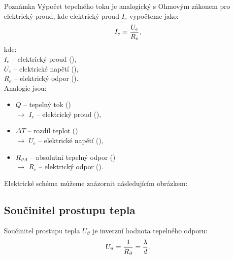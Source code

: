 \documentclass{article}
\begin{document}
\begin{notebox}{Poznámka}
    Výpočet tepelného toku je analogický s Ohmovým zákonem pro elektrický proud, kde elektrický proud $I_e$ vypočteme jako:
    \begin{equation}
        I_e = \frac{U_e}{R_e},
        \unit{(\ueqA)}
    \end{equation}
    kde:\\
    $I_e$ -- elektrický proud (\ueqA),\\
    $U_e$ -- elektrické napětí (\ueqV),\\
    $R_e$ -- elektrický odpor (\ueqOHM).\\

    Analogie jsou:
    \begin{itemize}
        \item $\dot{Q}$ -- tepelný tok (\ueqW)\\ $\rightarrow$ $I_e$ -- elektrický proud (\ueqA),
        \item $\Delta T$ -- rozdíl teplot (\ueqK)\\ $\rightarrow$ $U_e$ -- elektrické napětí (\ueqV),
        \item $R_{\vartheta A}$ -- absolutní tepelný odpor (\ueqKandWinv)\\ $\rightarrow$ $R_e$ -- elektrický odpor (\ueqOHM).
    \end{itemize}

    Elektrické schéma můžeme znázornit následujícím obrázkem:

    \begin{center}
    \end{center}
\end{notebox}



\subsection{Součinitel prostupu tepla}
Součinitel prostupu tepla $U_\vartheta$ je inverzní hodnota tepelného odporu:
\begin{equation}
    U_\vartheta = \frac{1}{R_{\vartheta}} = \frac{\lambda}{d}.
    \unit{(\ueqWandMinvsqKinv)}
\end{equation}
\end{document}
